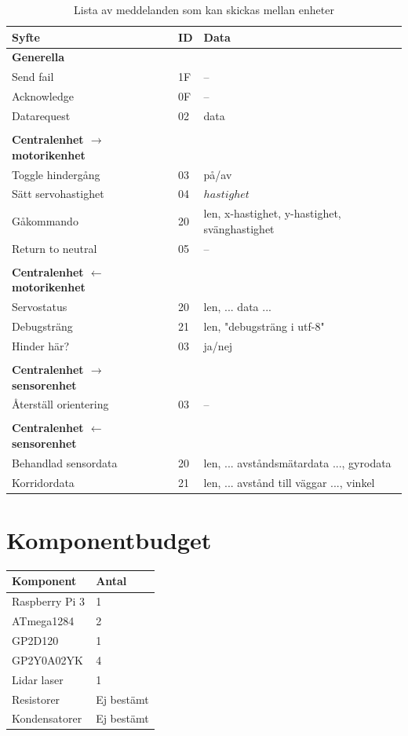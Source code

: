 \documentclass[a4paper,titlepage,12pt]{article}
\begin{document}
	\begin{table}
		\begin{longtable}[c]{ l l l }
			\textbf{Syfte} & \textbf{ID} & \textbf{Data} \\ \midrule
			\textbf{Generella} \\ \midrule
			Send fail & 1F & -- \\ \midrule
			Acknowledge & 0F & -- \\ \midrule
			Datarequest & 02 & data \\ \midrule
			\\
			\textbf{Centralenhet $ \to $ motorikenhet}\\ \midrule
			Toggle hindergång & 03 & på/av \\ \midrule
			Sätt servohastighet & 04 & $ hastighet $ \\ \midrule
			Gåkommando &  20 & len, x-hastighet, y-hastighet, svänghastighet \\ \midrule
			Return to neutral & 05 & -- \\ \midrule
			\\
			\textbf{Centralenhet $ \gets $ motorikenhet}\\ \midrule
			Servostatus & 20 & len, ... data ... \\ \midrule
			Debugsträng & 21 & len, "debugsträng i utf-8" \\ \midrule
			Hinder här? & 03 & ja/nej \\ \midrule
			\\
			\textbf{Centralenhet $\to$ sensorenhet} \\ \midrule
			Återställ orientering & 03 & -- \\ \midrule
			\\
			\textbf{Centralenhet $ \gets $ sensorenhet}\\ \midrule
			Behandlad sensordata & 20 & len, ... avståndsmätardata ..., gyrodata \\ \midrule
			Korridordata		 & 21 & len, ... avstånd till väggar ..., vinkel \\
		\end{longtable}

		\vspace{0.5cm}
		\label{table:messages}
		\caption{Lista av meddelanden som kan skickas mellan enheter}
	\end{table}
	
	\section{Komponentbudget}
	\begin{longtable}[c]{l l}
		\textbf{Komponent} & \textbf{Antal} \\ \midrule
		Raspberry Pi 3 & 1 \\
		ATmega1284 & 2 \\
		GP2D120 & 1 \\
		GP2Y0A02YK & 4 \\
		Lidar laser & 1 \\
		Resistorer & Ej bestämt \\
		Kondensatorer & Ej bestämt \\
	\end{longtable}
	
\end{document}
